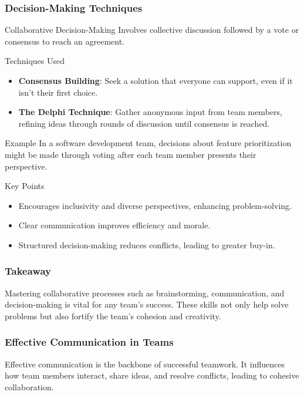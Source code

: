 \documentclass[aspectratio=169]{beamer}
\begin{document}
\begin{frame}[fragile]
    \frametitle{Decision-Making Techniques}
    \begin{block}{Collaborative Decision-Making}
        Involves collective discussion followed by a vote or consensus to reach an agreement.
    \end{block}
    
    \begin{block}{Techniques Used}
        \begin{itemize}
            \item \textbf{Consensus Building}: Seek a solution that everyone can support, even if it isn't their first choice.
            \item \textbf{The Delphi Technique}: Gather anonymous input from team members, refining ideas through rounds of discussion until consensus is reached.
        \end{itemize}
    \end{block}
    
    \begin{exampleblock}{Example}
        In a software development team, decisions about feature prioritization might be made through voting after each team member presents their perspective.
    \end{exampleblock}
    
    \begin{block}{Key Points}
        \begin{itemize}
            \item Encourages inclusivity and diverse perspectives, enhancing problem-solving.
            \item Clear communication improves efficiency and morale.
            \item Structured decision-making reduces conflicts, leading to greater buy-in.
        \end{itemize}
    \end{block}
\end{frame}

\begin{frame}[fragile]
    \frametitle{Takeaway}
    Mastering collaborative processes such as brainstorming, communication, and decision-making is vital for any team’s success. These skills not only help solve problems but also fortify the team’s cohesion and creativity.
\end{frame}

\begin{frame}[fragile]
    \frametitle{Effective Communication in Teams}
    Effective communication is the backbone of successful teamwork. It influences how team members interact, share ideas, and resolve conflicts, leading to cohesive collaboration. 
\end{frame}
\end{document}
